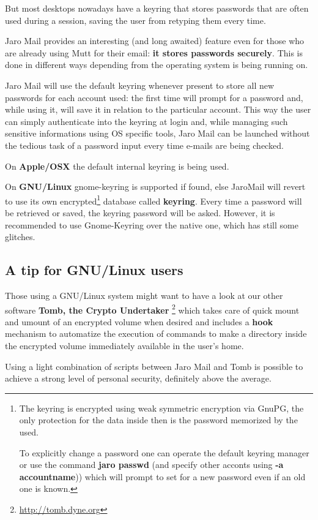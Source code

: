 \documentclass[a4,onecolumn,portrait]{article}
\begin{document}
But most desktops nowadays have a keyring that stores passwords that are often used during a session, saving the user from retyping them every time.

Jaro Mail provides an interesting (and long awaited) feature even for those who are already using Mutt for their email: \textbf{it stores passwords securely}. This is done in different ways depending from the operating system is being running on.

Jaro Mail will use the default keyring whenever present to store all new passwords for each account used: the first time will prompt for a password and, while using it, will save it in relation to the particular account. This way the user can simply authenticate into the keyring at login and, while managing such sensitive informations using OS specific tools, Jaro Mail can be launched without the tedious task of a password input every time e-mails are being checked.

On \textbf{Apple/OSX} the default internal keyring is being used.

On \textbf{GNU/Linux} gnome-keyring is supported if found, else JaroMail will revert to use its own encrypted\footnote{The keyring is encrypted using weak symmetric encryption via GnuPG, the only protection for the data inside then is the password memorized by the used.

To explicitly change a password one can operate the default keyring manager or use the command \textbf{jaro passwd} (and specify other acconts using \textbf{-a accountname})) which will prompt to set for a new password even if an old one is known.} database called \textbf{keyring}. Every time a password will be retrieved or saved, the keyring password will be asked. However, it is recommended to use Gnome-Keyring over the native one, which has still some glitches.
\subsection{A tip for GNU/Linux users}
\label{sec-11-2}

Those using a GNU/Linux system might want to have a look at our other software \textbf{Tomb, the Crypto Undertaker} \footnote{\url{http://tomb.dyne.org}} which takes care of quick mount and umount of an encrypted volume when desired and includes a \textbf{hook} mechanism to automatize the execution of commands to make a directory inside the encrypted volume immediately available in the user's home.

Using a light combination of scripts between Jaro Mail and Tomb is possible to achieve a strong level of personal security, definitely above the average.
\end{document}
